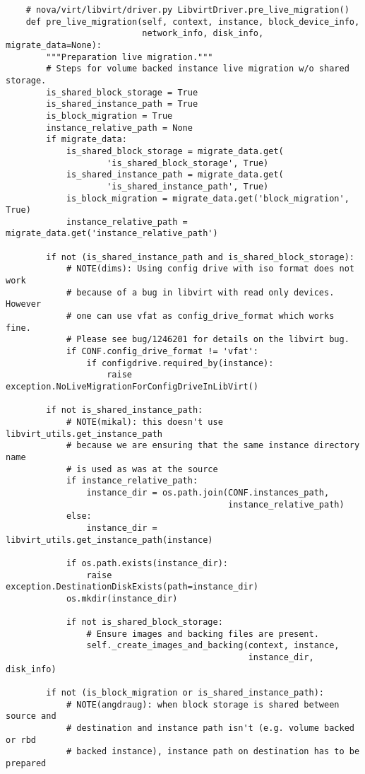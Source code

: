 \documentclass[a4paper,left=1.5cm,right=1.5cm,11pt]{article}
\begin{document}
    \begin{lstlisting}
    # nova/virt/libvirt/driver.py LibvirtDriver.pre_live_migration()
    def pre_live_migration(self, context, instance, block_device_info,
                           network_info, disk_info, migrate_data=None):
        """Preparation live migration."""
        # Steps for volume backed instance live migration w/o shared storage.
        is_shared_block_storage = True
        is_shared_instance_path = True
        is_block_migration = True
        instance_relative_path = None
        if migrate_data:
            is_shared_block_storage = migrate_data.get(
                    'is_shared_block_storage', True)
            is_shared_instance_path = migrate_data.get(
                    'is_shared_instance_path', True)
            is_block_migration = migrate_data.get('block_migration', True)
            instance_relative_path = migrate_data.get('instance_relative_path')

        if not (is_shared_instance_path and is_shared_block_storage):
            # NOTE(dims): Using config drive with iso format does not work
            # because of a bug in libvirt with read only devices. However
            # one can use vfat as config_drive_format which works fine.
            # Please see bug/1246201 for details on the libvirt bug.
            if CONF.config_drive_format != 'vfat':
                if configdrive.required_by(instance):
                    raise exception.NoLiveMigrationForConfigDriveInLibVirt()

        if not is_shared_instance_path:
            # NOTE(mikal): this doesn't use libvirt_utils.get_instance_path
            # because we are ensuring that the same instance directory name
            # is used as was at the source
            if instance_relative_path:
                instance_dir = os.path.join(CONF.instances_path,
                                            instance_relative_path)
            else:
                instance_dir = libvirt_utils.get_instance_path(instance)

            if os.path.exists(instance_dir):
                raise exception.DestinationDiskExists(path=instance_dir)
            os.mkdir(instance_dir)

            if not is_shared_block_storage:
                # Ensure images and backing files are present.
                self._create_images_and_backing(context, instance,
                                                instance_dir, disk_info)

        if not (is_block_migration or is_shared_instance_path):
            # NOTE(angdraug): when block storage is shared between source and
            # destination and instance path isn't (e.g. volume backed or rbd
            # backed instance), instance path on destination has to be prepared


\end{lstlisting}
\end{document}
